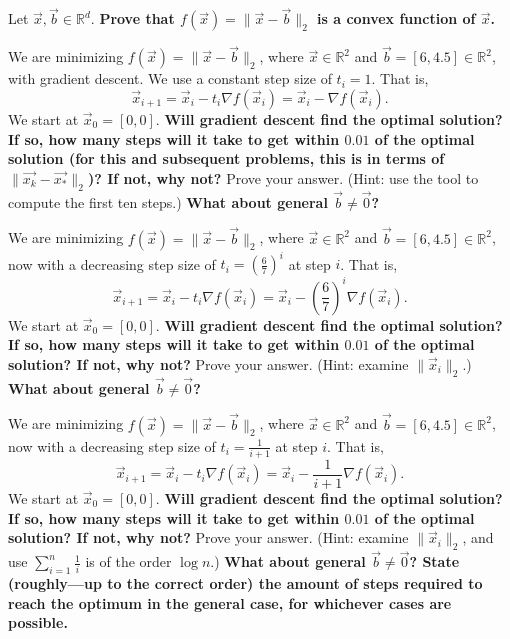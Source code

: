 \documentclass[11pt]{article}
\begin{document}
\begin{Parts}

\Part Let $\vec{x}, \vec{b} \in \mathbb{R}^d$.
{\bf Prove that $f(\vec{x}) = \|\vec{x}-\vec{b}\|_2$ is a convex function of $\vec{x}$.}







\Part We are minimizing $f(\vec{x}) = \|\vec{x}-\vec{b}\|_2$,
where $\vec{x} \in \mathbb{R}^2$ and $\vec{b} = [6, 4.5] \in \mathbb{R}^2$,
with gradient descent. We use a constant step size of $t_i = 1$. That is,
$$\vec{x}_{i+1} = \vec{x}_i - t_i \nabla f(\vec{x}_i) = \vec{x}_i - \nabla f(\vec{x}_i).$$
We start at $\vec{x}_0 = [0, 0].$
\textbf{Will gradient descent find the optimal solution?
If so, how many steps will it take to get within $0.01$ of the optimal solution (for this and subsequent problems, this is in terms of $\|\vec{x_k}-\vec{x_*}\|_2$)? If not, why not?}
Prove your answer. (Hint: use the tool to compute the first ten steps.)
\textbf{What about general $\vec{b} \neq \vec{0}$?}




\Part We are minimizing $f(\vec{x}) = \|\vec{x}-\vec{b}\|_2$,
where $\vec{x} \in \mathbb{R}^2$ and $\vec{b} = [6, 4.5] \in \mathbb{R}^2$,
now with a decreasing step size of $t_i = (\frac{6}{7})^i$ at step $i$. That is,
$$\vec{x}_{i+1} = \vec{x}_i - t_i \nabla f(\vec{x}_i) =
\vec{x}_i - (\frac{6}{7})^i \nabla f(\vec{x}_i).$$
We start at $\vec{x}_0 = [0, 0].$
\textbf{Will gradient descent find the optimal solution?
If so, how many steps will it take to get within $0.01$ of the optimal solution?
If not, why not?} Prove your answer. (Hint: examine $\|\vec{x}_i\|_2$.)
\textbf{What about general $\vec{b} \neq \vec{0}$?}




\Part We are minimizing $f(\vec{x}) = \|\vec{x}-\vec{b}\|_2$,
where $\vec{x} \in \mathbb{R}^2$ and $\vec{b} = [6, 4.5] \in \mathbb{R}^2$,
now with a decreasing step size of $t_i = \frac{1}{i+1}$ at step $i$. That is,
$$\vec{x}_{i+1} = \vec{x}_i - t_i \nabla f(\vec{x}_i)
= \vec{x}_i - \frac{1}{i+1} \nabla f(\vec{x}_i).$$
We start at $\vec{x}_0 = [0, 0].$
\textbf{Will gradient descent find the optimal solution?
If so, how many steps will it take to get within $0.01$ of the optimal solution?
If not, why not?}
Prove your answer. (Hint: examine $\|\vec{x}_i\|_2$,
and use $\sum_{i=1}^n \frac 1 i$ is of the order $\log n$.)
\textbf{What about general $\vec{b} \neq \vec{0}$? State (roughly---up to the correct order) the amount of steps required to reach the optimum in the general case, for whichever cases are possible.}





\end{Parts}
\end{document}
